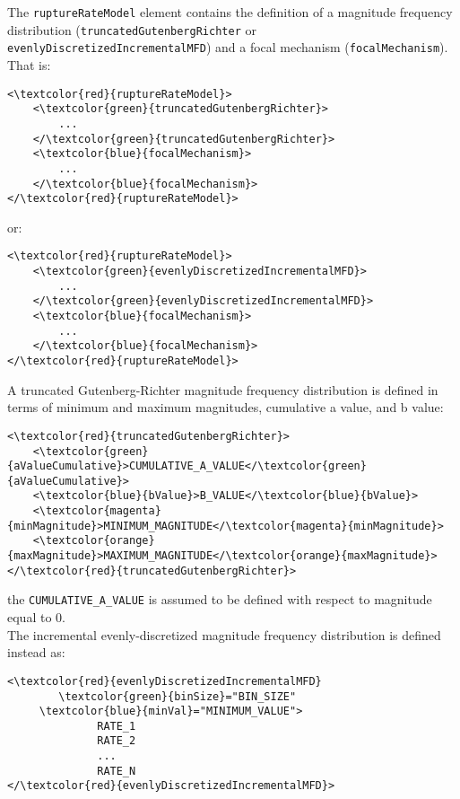 The \Verb+ruptureRateModel+ element contains the definition of a magnitude frequency distribution (\Verb+truncatedGutenbergRichter+ or \Verb+evenlyDiscretizedIncrementalMFD+) and a focal mechanism (\Verb+focalMechanism+). That is:
\begin{Verbatim}[frame=single, commandchars=\\\{\},fontsize=\normalsize, samepage=true]
<\textcolor{red}{ruptureRateModel}>
	<\textcolor{green}{truncatedGutenbergRichter}>
		...
	</\textcolor{green}{truncatedGutenbergRichter}>
	<\textcolor{blue}{focalMechanism}>
		...
	</\textcolor{blue}{focalMechanism}>
</\textcolor{red}{ruptureRateModel}>
\end{Verbatim}
or:
\begin{Verbatim}[frame=single, commandchars=\\\{\},fontsize=\normalsize, samepage=true]
<\textcolor{red}{ruptureRateModel}>
	<\textcolor{green}{evenlyDiscretizedIncrementalMFD}>
		...
	</\textcolor{green}{evenlyDiscretizedIncrementalMFD}>
	<\textcolor{blue}{focalMechanism}>
		...
	</\textcolor{blue}{focalMechanism}>
</\textcolor{red}{ruptureRateModel}>
\end{Verbatim}
A truncated Gutenberg-Richter magnitude frequency distribution is defined in terms of minimum and maximum magnitudes, cumulative a value, and b value:
\begin{Verbatim}[frame=single, commandchars=\\\{\},fontsize=\normalsize, samepage=true]
<\textcolor{red}{truncatedGutenbergRichter}>
	<\textcolor{green}{aValueCumulative}>CUMULATIVE_A_VALUE</\textcolor{green}{aValueCumulative}>
	<\textcolor{blue}{bValue}>B_VALUE</\textcolor{blue}{bValue}>
	<\textcolor{magenta}{minMagnitude}>MINIMUM_MAGNITUDE</\textcolor{magenta}{minMagnitude}>
	<\textcolor{orange}{maxMagnitude}>MAXIMUM_MAGNITUDE</\textcolor{orange}{maxMagnitude}>
</\textcolor{red}{truncatedGutenbergRichter}>
\end{Verbatim}
the \Verb+CUMULATIVE_A_VALUE+ is assumed to be defined with respect to magnitude equal to 0.\\
The incremental evenly-discretized magnitude frequency distribution is defined instead as:
\begin{Verbatim}[frame=single, commandchars=\\\{\},fontsize=\normalsize, samepage=true]
<\textcolor{red}{evenlyDiscretizedIncrementalMFD} 
        \textcolor{green}{binSize}="BIN_SIZE"
 	 \textcolor{blue}{minVal}="MINIMUM_VALUE">
              RATE_1
              RATE_2
              ...
              RATE_N
</\textcolor{red}{evenlyDiscretizedIncrementalMFD}>
\end{Verbatim}
